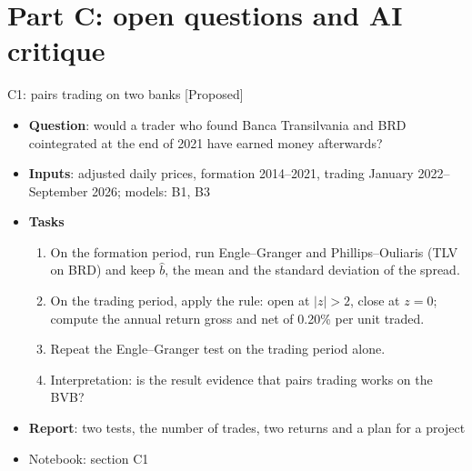 \section{Part C: open questions and AI critique}

\begin{frame}{C1: pairs trading on two banks [Proposed]}
\itemsize{\footnotesize}
\begin{itemize}
\item \textbf{Question}: would a trader who found Banca Transilvania and BRD cointegrated at the end of 2021 have earned money afterwards?
\item \textbf{Inputs}: adjusted daily prices, formation 2014--2021, trading January 2022--September 2026; models: B1, B3
\item \textbf{Tasks}
\begin{enumerate}
    \item On the formation period, run Engle--Granger and Phillips--Ouliaris (TLV on BRD) and keep $\hat b$, the mean and the standard deviation of the spread.
    \item On the trading period, apply the rule: open at $|z| > 2$, close at $z = 0$; compute the annual return gross and net of 0.20\% per unit traded.
    \item Repeat the Engle--Granger test on the trading period alone.
    \item Interpretation: is the result evidence that pairs trading works on the BVB?
\end{enumerate}
\item \textbf{Report}: two tests, the number of trades, two returns and a plan for a project
\item Notebook: section C1
\end{itemize}
\end{frame}

